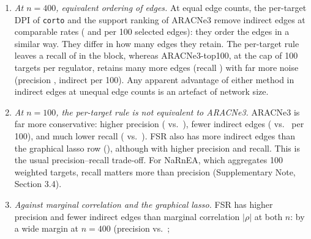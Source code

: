 \documentclass[11pt,a4paper]{article}
\theoremstyle{plain}
\theoremstyle{remark}
\newcommand{\FSR}{FSR}
\begin{document}
\begin{enumerate}
  \item \emph{At $n=400$, equivalent ordering of edges.} At equal edge counts, the per-target DPI of \texttt{corto} and the support ranking of
  ARACNe3 remove indirect edges at comparable rates (\AThreenFourZeroZerocortoranksrZeroTwotopOneZeroZeroschemeAindirectOneZeroZero{} and
  \AThreenFourZeroZeroARACNeThreebysupporttopFourFiveThreeBmatchedindirectOneZeroZero{} per 100 selected edges): they order the edges in a similar
  way. They differ in how many edges they retain. The per-target rule leaves a recall of
  \AThreenFourZeroZerocortoranksrZeroTwotopOneZeroZeroschemeArecall{} in the block, whereas ARACNe3-top100, at the cap of 100 targets per regulator,
  retains many more edges (recall \AThreenFourZeroZeroARACNeThreetopOneZeroZeroschemeBrecall{}) with far more noise (precision
  \AThreenFourZeroZeroARACNeThreetopOneZeroZeroschemeBprecision{}, \AThreenFourZeroZeroARACNeThreetopOneZeroZeroschemeBindirectOneZeroZero{} indirect per 100).
  Any apparent advantage of either method in indirect edges at unequal edge counts is an artefact of network size.
  \item \emph{At $n=100$, the per-target rule is not equivalent to ARACNe3.} ARACNe3 is far more conservative: higher precision
  (\AThreenOneZeroZeroARACNeThreebysupporttopSevenFourThreeBmatchedprecision{} vs.\ \AThreenOneZeroZerocortoranksrZeroTwotopOneZeroZeroschemeAprecision{}), fewer indirect edges
  (\AThreenOneZeroZeroARACNeThreebysupporttopSevenFourThreeBmatchedindirectOneZeroZero{} vs.\ \AThreenOneZeroZerocortoranksrZeroTwotopOneZeroZeroschemeAindirectOneZeroZero{} per 100), and
  much lower recall (\AThreenOneZeroZeroARACNeThreebysupporttopSevenFourThreeBmatchedrecall{} vs.\ \AThreenOneZeroZerocortoranksrZeroTwotopOneZeroZeroschemeArecall{}). \FSR{} also
  has more indirect edges than the graphical lasso row (\AThreenOneZeroZeroglassopartialcorrlambdaZeroOnetopSevenFourThreeindirectOneZeroZero{}), although with higher precision and recall.
  This is the usual precision--recall trade-off. For NaRnEA, which aggregates 100 weighted targets, recall matters more than precision
  (Supplementary Note, Section 3.4).
  \item \emph{Against marginal correlation and the graphical lasso.} \FSR{} has higher precision and fewer indirect edges than marginal correlation $|\rho|$ at both $n$:
  by a wide margin at $n=400$ (precision \AThreenFourZeroZerocortoranksrZeroTwotopOneZeroZeroschemeAprecision{} vs.\ \AThreenFourZeroZeromarginalrhotopFourFiveThreeprecision{};

\end{enumerate}
\end{document}
